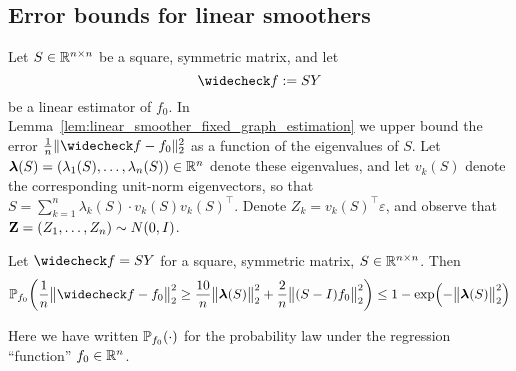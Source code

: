 \subsection{Error bounds for linear smoothers}

Let $S \in \mathbb{R}^{n \times n}$ be a square, symmetric matrix, and let 
\begin{equation*}
\wc{f} := SY
\end{equation*}
be a linear estimator of $f_0$. In  Lemma~\ref{lem:linear_smoother_fixed_graph_estimation} we upper bound the error $\frac{1}{n}\|\wc{f} - f_0\|_2^2$ as a function of the eigenvalues of $S$. Let $\boldsymbol{\lambda}(S) = (\lambda_1(S),\ldots,\lambda_n(S)) \in \mathbb{R}^n$ denote these eigenvalues, and let $v_k(S)$ denote the corresponding unit-norm eigenvectors, so that $S = \sum_{k = 1}^{n} \lambda_k(S) \cdot v_k(S) v_k(S)^{\top}$. Denote $Z_k = v_k(S)^{\top} \varepsilon$, and observe that ${\bf Z} = (Z_1,\ldots,Z_n) \sim N(0,I)$. 

\begin{lemma}
	\label{lem:linear_smoother_fixed_graph_estimation}
	Let $\wc{f} = SY$ for a square, symmetric matrix, $S \in \mathbb{R}^{n \times n}$. Then
	\begin{equation*}
	\Pbb_{f_0}\biggl(\frac{1}{n}\bigl\|\wc{f} - f_0\bigr\|_2^2 \geq \frac{10}{n} \bigl\|\lambdavec(S)\bigr\|_2^2 + \frac{2}{n}\bigl\|(S - I)f_0\bigr\|_2^2\biggr) \leq 1 - \exp\Bigl(-\bigl\|\lambdavec(S)\bigr\|_2^2\Bigr)
	\end{equation*}
\end{lemma}
Here we have written $\mathbb{P}_{f_0}(\cdot)$ for the probability law under the regression ``function'' $f_0 \in \mathbb{R}^n$. 

